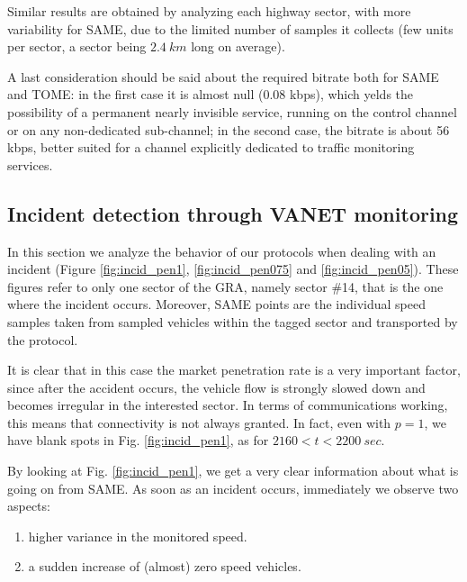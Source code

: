 \documentclass[conference]{IEEEtran}
\begin{document}
Similar results are obtained by analyzing each highway sector, with more variability for SAME, due to the limited number of samples it collects (few units per sector, a sector being $2.4~km$ long on average).

A last consideration should be said about the required bitrate both for SAME and TOME: in the first case it is almost null (0.08 kbps), which yelds the possibility of a permanent nearly invisible service, running on the control channel or on any non-dedicated sub-channel; in the second case, the bitrate is about 56 kbps, better suited for a channel explicitly dedicated to traffic monitoring services.





\subsection{Incident detection through VANET monitoring}
\label{subsec:stationary}
In this section we analyze the behavior of our protocols when dealing with an incident (Figure \ref{fig:incid_pen1}, \ref{fig:incid_pen075} and \ref{fig:incid_pen05}). These figures refer to only one sector of the GRA, namely sector \#14, that is the one where the incident occurs. Moreover, SAME points are the individual speed samples taken from sampled vehicles within the tagged sector and transported by the protocol.

It is clear that in this case the market penetration rate is a very important factor, since after the accident occurs, the vehicle flow is strongly slowed down and becomes irregular in the interested sector. In terms of communications working, this means that connectivity is not always granted. In fact, even with $p=1$, we have  blank spots in Fig. \ref{fig:incid_pen1}, as for  $2160 < t < 2200~sec$.

By looking at Fig. \ref{fig:incid_pen1}, we get a very clear information about what is going on from SAME. As soon as an incident occurs, immediately we observe two aspects:
\begin{enumerate}
	\item higher variance in the monitored speed.
	\item a sudden increase of (almost) zero speed vehicles.
\end{enumerate}
\end{document}
